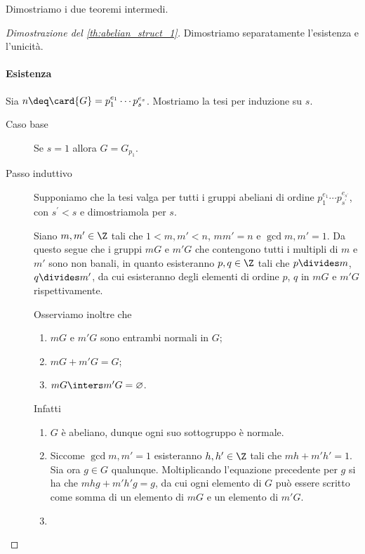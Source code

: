 Dimostriamo i due teoremi intermedi.
\begin{proof}
    [Dimostrazione del \autoref{th:abelian_struct_1}]
    Dimostriamo separatamente l'esistenza e l'unicità.
    \paragraph{Esistenza} Sia $n \deq \card{G} = p_1^{e_1}\cdots p_s^{e_s}$. Mostriamo la tesi per induzione su $s$.
    \begin{description}
        \item[Caso base] Se $s = 1$ allora $G = G_{p_1}$.
        \item[Passo induttivo] Supponiamo che la tesi valga per tutti i gruppi abeliani di ordine $p_1^{e_1}\cdots p_{s^\prime}^{e_{s^\prime}}$, con $s^\prime < s$ e dimostriamola per $s$.
        
        Siano $m, m' \in \Z$ tali che $1 < m, m' < n$, $mm' = n$ e $\gcd{m, m'} = 1$. Da questo segue che i gruppi $mG$ e $m'G$ che contengono tutti i multipli di $m$ e $m'$ sono non banali, in quanto esisteranno $p, q \in \Z$ tali che $p \divides m$, $q \divides m'$, da cui esisteranno degli elementi di ordine $p$, $q$ in $mG$ e $m'G$ rispettivamente.
        
        Osserviamo inoltre che \begin{enumerate}
            \item $mG$ e $m'G$ sono entrambi normali in $G$;
            \item $mG + m'G = G$;
            \item $mG \inters m'G = \varnothing$.
        \end{enumerate}
        Infatti \begin{enumerate}
            \item $G$ è abeliano, dunque ogni suo sottogruppo è normale.
            \item Siccome $\gcd{m, m'} = 1$ esisteranno $h, h' \in \Z$ tali che $mh + m'h' = 1$. Sia ora $g \in G$ qualunque. Moltiplicando l'equazione precedente per $g$ si ha che $mhg + m'h'g = g$, da cui ogni elemento di $G$ può essere scritto come somma di un elemento di $mG$ e un elemento di $m'G$.
            \item 
        \end{enumerate}
    \end{description}
\end{proof}